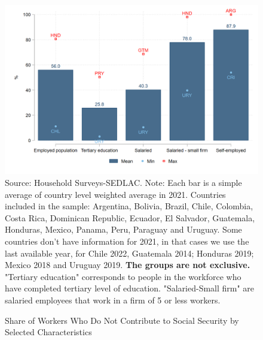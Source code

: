 \documentclass[english]{article}
\begin{document}
\begin{enumerate}
        \begin{figure}[h!tbp]
        \justifying
        \caption{Share of Workers Who Do Not Contribute to Social Security by Selected Characteristics}     
        \includegraphics[scale=.3]{latex/figures/Snapshot/Social security contributions.png}
        \label{fig:SScontributions}
        \footnotesize{Source: Household Surveys-SEDLAC.}
        \footnotesize{Note: Each bar is a simple average of country level weighted average in 2021. Countries included in the sample: Argentina, Bolivia, Brazil, Chile, Colombia, Costa Rica, Dominican Republic, Ecuador, El Salvador, Guatemala, Honduras, Mexico, Panama, Peru, Paraguay and Uruguay. Some countries don’t have information for 2021, in that cases we use the last available year, for Chile 2022, Guatemala 2014; Honduras 2019; Mexico 2018 and Uruguay 2019. \textbf{The groups are not exclusive.} "Tertiary education" corresponds to people in the workforce who have completed tertiary level of education. "Salaried-Small firm" are salaried employees that work in a firm of 5 or less workers.}
        \end{figure}



\end{enumerate}
\end{document}
